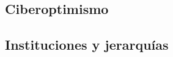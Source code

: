 \begin{comment}
"In controversies, any actor can decompose in a loose
network and any network, not matter how heterogeneous, can coagulate to function as
an actor."

"To understand how social phenomena are built it is not
enough to observe the actors alone nor is it enough to observe social networks once they are
stabilized. What should be observed are the actors-networks—that is to say, the fleeting con-
figurations where actors are renegotiating the ties of old networks and the emergence of new
networks is redefining the identity of actors."

"an actor is anything doing something. "

"there is no such thing as an isolated actor. Actors are always composed
by and components of networks."

"Actors are such because they inter-act, shaping relations"

\end{comment}

\subsection{Ciberoptimismo}

\begin{comment}
community network projects: are to be found in the context of (2nd wave) cyber optimism: "decentralization", "distributed control", "self-governance", "non-hierarchical organization"

## técnica y política

> framing the Internet alternately as lawless, anarchic,
> free, “a world where anyone, anywhere may express his or her beliefs, no matter how singular,
> without fear of being coerced into silence or conformity” (Barlow 1996) (p.1)

* la infraestructura está prerequisito para participación
\end{comment}

\subsection{Instituciones y jerarquías}

\begin{comment}
## statutory vs capillary power

formal establishments / social mechanisms

> Even if there are no institutions (as formal establishments) regulating behavior,
> there are always institutions in the sense of mechanisms,
> rules, and established dynamics.
\end{comment}

